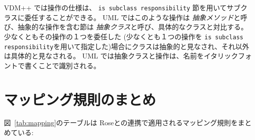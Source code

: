 \documentclass[\pformat,12pt]{jarticle}
\newcommand{\vdmpp}{VDM++}
\newcommand{\link}{Roseとの連携}
\begin{document}
 \vdmpp{} では操作の仕様は、 {\tt is subclass responsibility} 節を用いてサブクラスに委任することができる。
UML ではこのような操作は {\it 抽象メソッド}と呼び、抽象的な操作を含む節は {\it 抽象クラス}と呼び、具体的なクラスと対比する。
少なくともその操作の１つを委任した (少なくとも１つの操作を {\tt is subclass responsibility}を用いて指定した)場合にクラスは抽象的と見なされ、それ以外は具体的と見なされる。
 UML では抽象クラスと操作は、名前をイタリックフォントで書くことで識別される。


\newpage
  
  
\newpage
\appendix
\section{マッピング規則のまとめ} \label{rules}
図~\ref{tab:mapping}のテーブルは \link{}で適用されるマッピング規則をまとめている:  
\end{document}
